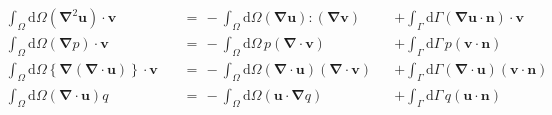 \documentclass[11pt,a4paper]{report}
\begin{document}
%
%
%

\begin{align*}
&\int_{\Omega}\mathrm{d}\Omega\left(\boldsymbol{\nabla}^{2}\boldsymbol{u}\right)\cdot\boldsymbol{v}&&\,=\, -\int_{\Omega}\mathrm{d}\Omega\left(\boldsymbol{\nabla}\boldsymbol{u}\right):\left(\boldsymbol{\nabla}\boldsymbol{v}\right)
&&+\int_{\Gamma}\mathrm{d}\Gamma \left(\boldsymbol{\nabla}\boldsymbol{u}\cdot\boldsymbol{n}\right)\cdot\boldsymbol{v} \\
&\int_{\Omega}\mathrm{d}\Omega\left(\boldsymbol{\nabla}p\right)\cdot\boldsymbol{v}&&\,=\, -\int_{\Omega}\mathrm{d}\Omega \,p\left(\boldsymbol{\nabla}\cdot\boldsymbol{v}\right)&&+\int_{\Gamma}\mathrm{d}\Gamma \,p\left(\boldsymbol{v}\cdot\boldsymbol{n}\right) \\
&\int_{\Omega}\mathrm{d}\Omega\left\lbrace\boldsymbol{\nabla}\left(\boldsymbol{\nabla}\cdot\boldsymbol{u}\right)\right\rbrace\cdot\boldsymbol{v}&&\,=\, -\int_{\Omega}\mathrm{d}\Omega\left(\boldsymbol{\nabla}\cdot\boldsymbol{u}\right)\left(\boldsymbol{\nabla}\cdot\boldsymbol{v}\right)&&+\int_{\Gamma}\mathrm{d}\Gamma \left(\boldsymbol{\nabla}\cdot\boldsymbol{u}\right)\left(\boldsymbol{v}\cdot\boldsymbol{n}\right) \\
&\int_{\Omega}\mathrm{d}\Omega\left(\boldsymbol{\nabla}\cdot\boldsymbol{u}\right)q &&\,=\, -\int_{\Omega}\mathrm{d}\Omega\left(\boldsymbol{u}\cdot\boldsymbol{\nabla}q\right)&&+\int_{\Gamma}\mathrm{d}\Gamma \,q \left(\boldsymbol{u}\cdot\boldsymbol{n}\right)
\end{align*}
\end{document}
